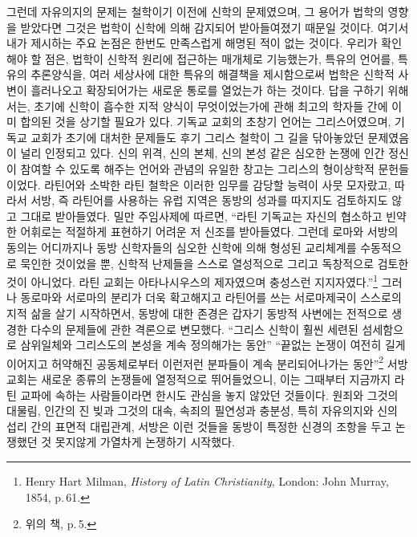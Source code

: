 그런데 자유의지의 문제는
철학이기 이전에 신학의 문제였으며,
그 용어가 법학의 영향을 받았다면
그것은
법학이 신학에 의해 감지되어 받아들여졌기 때문일 것이다.
여기서 내가 제시하는 주요 논점은 한번도 만족스럽게 해명된 적이 없는 것이다.
우리가 확인해야 할 점은,
법학이
신학적 원리에 접근하는 매개체로
기능했는가,
특유의 언어를, 특유의 추론양식을, 여러 세상사에 대한 특유의 해결책을
제시함으로써 법학은 신학적 사변이 흘러나오고 확장되어가는
새로운 통로를 열었는가 하는 것이다.
답을 구하기 위해서는,
초기에 신학이 흡수한 지적 양식이 무엇이었는가에 관해
최고의 학자들 간에 이미 합의된 것을 상기할 필요가 있다.
기독교 교회의 초창기 언어는 그리스어였으며,
기독교 교회가 초기에 대처한 문제들도
후기 그리스 철학이 그 길을 닦아놓았던 문제였음이
널리 인정되고 있다.
신의 위격,
신의 본체,
신의 본성 같은 심오한 논쟁에 인간 정신이 참여할 수 있도록
해주는 언어와 관념의 유일한 창고는
그리스의 형이상학적 문헌들이었다.
라틴어와 소박한 라틴 철학은 이러한 임무를 감당할 능력이 사뭇 모자랐고,
따라서 서방, 즉 라틴어를 사용하는 유럽 지역은
동방의 성과를 따지지도 검토하지도 않고 그대로 받아들였다.
밀만 주임사제에 따르면,
``라틴 기독교는 자신의 협소하고 빈약한 어휘로는 적절하게 표현하기 어려운
저 신조를 받아들였다.
그런데 로마와 서방의 동의는 어디까지나
동방 신학자들의
심오한 신학에 의해 형성된 교리체계를 수동적으로 묵인한 것이었을 뿐,
신학적 난제들을 스스로 열성적으로 그리고 독창적으로 검토한 것이 아니었다.
라틴 교회는 아타나시우스의 제자였으며
충성스런 지지자였다.''\footnote{%
  Henry Hart Milman, \textit{History of Latin Christianity},
  London: John Murray, 1854, p.\,61.
  }
그러나 동로마와 서로마의 분리가 더욱 확고해지고
라틴어를 쓰는 서로마제국이 스스로의 지적 삶을 살기 시작하면서,
동방에 대한 존경은 갑자기
동방적 사변에는 전적으로 생경한
다수의 문제들에 관한 격론으로 변모했다.
``그리스 신학이
훨씬 세련된 섬세함으로 삼위일체와 그리스도의 본성을 계속 정의해가는 동안''
``끝없는 논쟁이 여전히 길게 이어지고
허약해진 공동체로부터 이런저런 분파들이 계속 분리되어나가는 동안''\footnote{%
  위의 책, p.\,5.
  }
서방 교회는
새로운 종류의 논쟁들에 열정적으로 뛰어들었으니,
이는 그때부터 지금까지 라틴 교파에 속하는 사람들이라면 한시도
관심을 놓지 않았던 것들이다.
원죄와 그것의 대물림,
인간의 진 빚과 그것의 대속,
속죄의 필연성과 충분성,
특히 자유의지와 신의 섭리 간의 표면적 대립관계,
서방은
이런 것들을
동방이 특정한 신경의 조항을 두고 논쟁했던 것 못지않게
가열차게 논쟁하기 시작했다.
